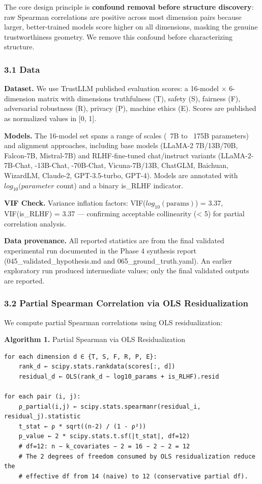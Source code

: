 
The core design principle is \textbf{confound removal before structure discovery}: raw Spearman correlations are positive across most dimension pairs because larger, better-trained models score higher on all dimensions, masking the genuine trustworthiness geometry. We remove this confound before characterizing structure.

\subsubsection{3.1 Data}

\textbf{Dataset.} We use TrustLLM \citep{Sun2024TrustLLM} published evaluation scores: a 16-model $\times$ 6-dimension matrix with dimensions {truthfulness (T), safety (S), fairness (F), adversarial robustness (R), privacy (P), machine ethics (E)}. Scores are published as normalized values in [0, 1].

\textbf{Models.} The 16-model set spans a range of scales (~7B to ~175B parameters) and alignment approaches, including base models (LLaMA-2 7B/13B/70B, Falcon-7B, Mistral-7B) and RLHF-fine-tuned chat/instruct variants (LLaMA-2-7B-Chat, -13B-Chat, -70B-Chat, Vicuna-7B/13B, ChatGLM, Baichuan, WizardLM, Claude-2, GPT-3.5-turbo, GPT-4). Models are annotated with $log_{10}(parameter$ count) and a binary is\_RLHF indicator.

\textbf{VIF Check.} Variance inflation factors: VIF($log_{10}(\text{params})$) = 3.37, VIF(is\_RLHF) = 3.37 --- confirming acceptable collinearity (< 5) for partial correlation analysis.

\textbf{Data provenance.} All reported statistics are from the final validated experimental run documented in the Phase 4 synthesis report (045\_validated\_hypothesis.md and 065\_ground\_truth.yaml). An earlier exploratory run produced intermediate values; only the final validated outputs are reported.

\subsubsection{3.2 Partial Spearman Correlation via OLS Residualization}

We compute partial Spearman correlations using OLS residualization:

\textbf{Algorithm 1.} Partial Spearman via OLS Residualization

\begin{verbatim}
for each dimension d ∈ {T, S, F, R, P, E}:
    rank_d ← scipy.stats.rankdata(scores[:, d])
    residual_d ← OLS(rank_d ~ log10_params + is_RLHF).resid

for each pair (i, j):
    ρ_partial(i,j) ← scipy.stats.spearmanr(residual_i, residual_j).statistic
    t_stat ← ρ * sqrt((n-2) / (1 - ρ²))
    p_value ← 2 * scipy.stats.t.sf(|t_stat|, df=12)
    # df=12: n − k_covariates − 2 = 16 − 2 − 2 = 12
    # The 2 degrees of freedom consumed by OLS residualization reduce the
    # effective df from 14 (naive) to 12 (conservative partial df).
\end{verbatim}

